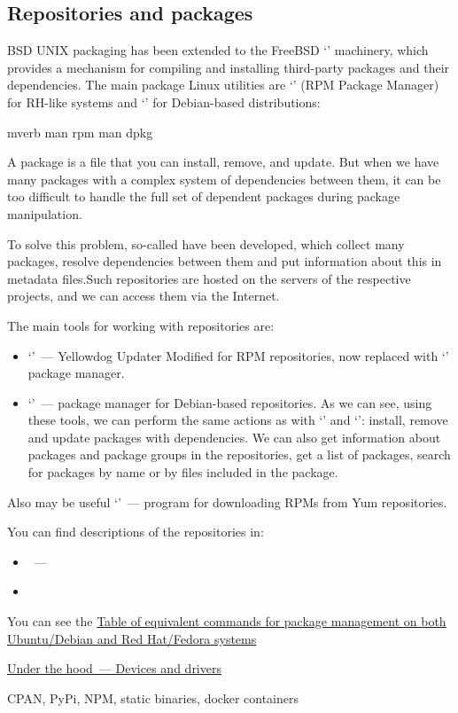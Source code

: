 \subsection*{Repositories and packages} %

BSD UNIX packaging has been extended to the FreeBSD `' machinery,
which provides a mechanism for compiling and installing third-party packages
and their dependencies. The main package Linux utilities are `'
(RPM Package Manager) for RH-like systems and `' for
Debian-based distributions:
\begin{code}{mverb}
man rpm
man dpkg
\end{code}
A package is a file that you can install, remove, and update. But when we have
many packages with a complex system of dependencies between them, it can be
too difficult to handle the full set of dependent packages during package
manipulation.

To solve this problem, so-called  have been developed,
which collect many packages, resolve dependencies between them and put
information about this in metadata files.Such repositories are hosted on
the servers of the respective projects, and we can access them via
the Internet.

The main tools for working with repositories are:
\begin{itemize}
\item `'~--- Yellowdog Updater Modified for RPM repositories,
      now replaced with `' package manager.
\item `'~--- package manager for Debian-based repositories.
      As we can see, using these tools, we can perform the same actions as with
      `' and `': install, remove and update packages
      with dependencies. We can also get information about packages and
      package groups in the repositories, get a list of packages, search for
      packages by name or by files included in the package.
\end{itemize}

Also may be useful `'~--- program for downloading RPMs
from Yum repositories.

You can find descriptions of the repositories in:
\begin{itemize}
\item {}~---
\item {}
\end{itemize}

You can see the \href{https://help.ubuntu.com/community/SwitchingToUbuntu/FromLinux/RedHatEnterpriseLinuxAndFedora}%
{Table of equivalent commands for package management on both Ubuntu/Debian
and Red Hat/Fedora systems}

\href{under_the_hood/devices_and_drivers.md}{Under the hood~--- Devices and drivers}

CPAN, PyPi, NPM, static binaries, docker containers
